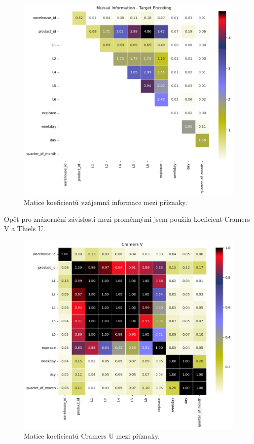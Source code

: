 \begin{figure}[hbtp!]
    \centering
    \includegraphics[width=.8\textwidth]{obrazky/zntb/MI_TE.png}
    \caption{Matice koeficientů vzájemná informace mezi příznaky.}
    \label{obr:nb:MI}
\end{figure}

Opět pro znázornění závislosti mezi proměnnými jsem použila koeficient Cramers V a Thiels U. %

\begin{figure}[hbtp!]
    \centering
    \includegraphics[width=.8\textwidth]{obrazky/zntb/cramers_u.png}
    \caption{Matice koeficientů Cramers U mezi příznaky.}
    \label{obr:nb:cramers}
\end{figure}


